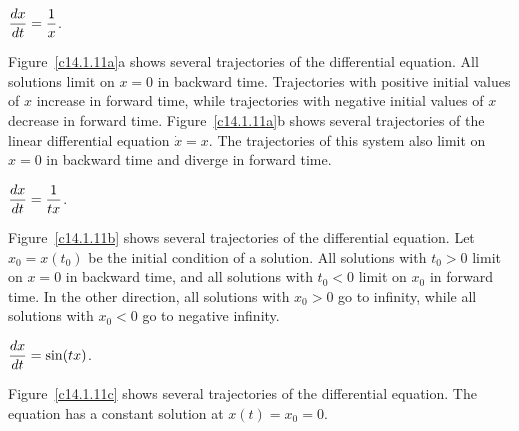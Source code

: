 \documentclass{ximera}
\begin{document}
\begin{exercise} \label{c14.1.11a}
$\displaystyle\frac{dx}{dt} = \frac{1}{x}$.

\begin{solution}
Figure~\ref{c14.1.11a}a shows several trajectories of the
differential equation.  All solutions limit on $x = 0$ in backward
time.  Trajectories with positive initial values of $x$ increase in
forward time, while trajectories with negative initial values of $x$
decrease in forward time.  Figure~\ref{c14.1.11a}b shows several trajectories
of the linear differential equation $\dot{x} = x$.  The trajectories of this
system also limit on $x = 0$ in backward time and diverge in forward time.

\begin{figure}[htb]
                       \centerline{%
                       }
\end{figure}

\end{solution}
\end{exercise}
\begin{exercise} \label{c14.1.11b}
$\displaystyle\frac{dx}{dt} = \frac{1}{tx}$.

\begin{solution}
Figure~\ref{c14.1.11b} shows several trajectories of the
differential equation.  Let $x_0 = x(t_0)$ be the initial condition of
a solution.  All solutions with $t_0 > 0$ limit on $x = 0$ in backward time,
and all solutions with $t_0 < 0$ limit on $x_0$ in forward time.  In the
other direction, all solutions with $x_0 > 0$ go to infinity, while all
solutions with $x_0 < 0$ go to negative infinity.

\begin{figure}[htb]
                       \centerline{%
                       }
\end{figure}

\end{solution}
\end{exercise}
\begin{exercise} \label{c14.1.11c}
$\displaystyle\frac{dx}{dt} = \sin(tx)$.

\begin{solution}
Figure~\ref{c14.1.11c} shows several trajectories of the
differential equation.  The equation has a constant solution at $x(t)
= x_0 = 0$.

\begin{figure}[htb]
                       \centerline{%
                       }
\end{figure}

\end{solution}
\end{exercise}
\end{document}

